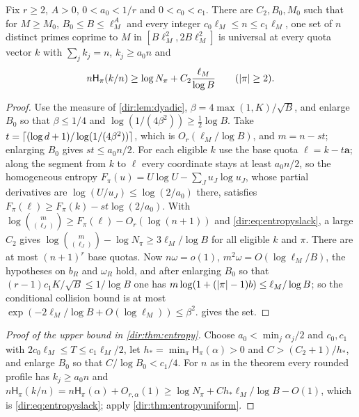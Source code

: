 \begin{theorem}\label{dir:thm:entropyuniform}
Fix $r\ge2$, $A>0$, $0<a_0<1/r$ and $0<c_0<c_1$. There are $C_2,B_0,M_0$ such that for $M\ge M_0$,
$B_0\le B\le\ell_M^A$ and every integer $c_0\ell_M\le n\le c_1\ell_M$, one set of $n$ distinct primes coprime to
$M$ in $[B\ell_M^2,2B\ell_M^2]$ is universal at every quota vector $k$ with $\sum_jk_j=n$, $k_j\ge a_0n$ and
\begin{equation}\label{dir:eq:entropyslack}
 n\mathsf H_\pi(k/n)\ge\log N_\pi+C_2\frac{\ell_M}{\log B}\qquad(\lvert\pi\rvert\ge2).
\end{equation}
\end{theorem}

\begin{proof}
Use the measure of \cref{dir:lem:dyadic}, $\beta=4\max(1,K)/\sqrt B$, and enlarge $B_0$ so that
$\beta\le1/4$ and $\log(1/(4\beta^2))\ge\frac12\log B$. Take $t=\lceil(\log d+1)/\log(1/(4\beta^2))\rceil$,
which is $O_r(\ell_M/\log B)$, and $m=n-st$; enlarging $B_0$ gives $st\le a_0n/2$. For each eligible $k$ use
the base quota $\ell=k-t\mathbf a$; along the segment from $k$ to $\ell$ every coordinate stays at least
$a_0n/2$, so the homogeneous entropy $F_\pi(u)=U\log U-\sum_Ju_J\log u_J$, whose partial derivatives are
$\log(U/u_J)\le\log(2/a_0)$ there, satisfies $F_\pi(\ell)\ge F_\pi(k)-st\log(2/a_0)$. With
$\log\binom m{(\ell_J)}\ge F_\pi(\ell)-O_r(\log(n+1))$ and \eqref{dir:eq:entropyslack}, a large $C_2$ gives
$\log\binom m{(\ell_J)}-\log N_\pi\ge3\ell_M/\log B$ for all eligible $k$ and $\pi$. There are at most
$(n+1)^r$ base quotas. Now $n\omega=o(1)$, $m^2\omega=O(\log\ell_M/B)$, the hypotheses on $b_R$ and $\omega_R$
hold, and after enlarging $B_0$ so that $(r-1)c_1K/\sqrt B\le1/\log B$ one has
$m\log(1+(\lvert\pi\rvert-1)b)\le\ell_M/\log B$; so the conditional collision bound is at most
$\exp(-2\ell_M/\log B+O(\log\ell_M))\le\beta^2$.  gives the set.
\end{proof}

\begin{proof}[Proof of the upper bound in \cref{dir:thm:entropy}]
Choose $a_0<\min_j\alpha_j/2$ and $c_0,c_1$ with $2c_0\ell_M\le T\le c_1\ell_M/2$, let
$h_*=\min_\pi\mathsf H_\pi(\alpha)>0$ and $C>(C_2+1)/h_*$, and enlarge $B_0$ so that $C/\log B_0<c_1/4$. For
$n$ as in the theorem every rounded profile has $k_j\ge a_0n$ and
$n\mathsf H_\pi(k/n)=n\mathsf H_\pi(\alpha)+O_{r,\alpha}(1)\ge\log N_\pi+Ch_*\ell_M/\log B-O(1)$, which is
\eqref{dir:eq:entropyslack}; apply \cref{dir:thm:entropyuniform}.
\end{proof}

